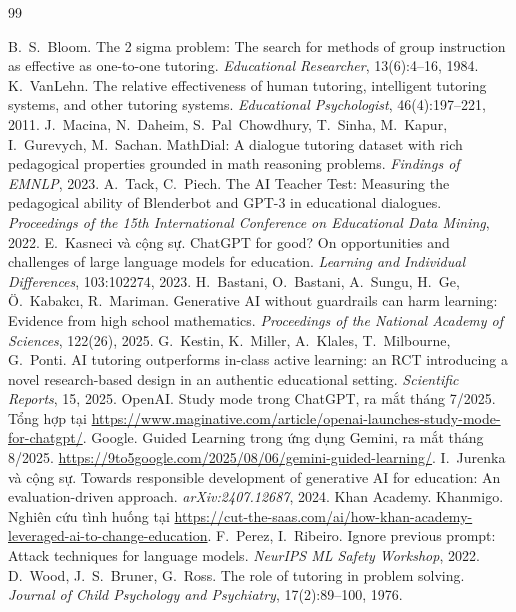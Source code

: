 \begin{thebibliography}{99}\small
\setlength{\itemsep}{2pt}

 B.~S.~Bloom. The 2 sigma problem: The search for methods of group instruction as effective as one-to-one tutoring. \emph{Educational Researcher}, 13(6):4--16, 1984.
 K.~VanLehn. The relative effectiveness of human tutoring, intelligent tutoring systems, and other tutoring systems. \emph{Educational Psychologist}, 46(4):197--221, 2011.
 J.~Macina, N.~Daheim, S.~Pal~Chowdhury, T.~Sinha, M.~Kapur, I.~Gurevych, M.~Sachan. MathDial: A dialogue tutoring dataset with rich pedagogical properties grounded in math reasoning problems. \emph{Findings of EMNLP}, 2023.
 A.~Tack, C.~Piech. The AI Teacher Test: Measuring the pedagogical ability of Blenderbot and GPT-3 in educational dialogues. \emph{Proceedings of the 15th International Conference on Educational Data Mining}, 2022.
 E.~Kasneci và cộng sự. ChatGPT for good? On opportunities and challenges of large language models for education. \emph{Learning and Individual Differences}, 103:102274, 2023.
 H.~Bastani, O.~Bastani, A.~Sungu, H.~Ge, Ö.~Kabakcı, R.~Mariman. Generative AI without guardrails can harm learning: Evidence from high school mathematics. \emph{Proceedings of the National Academy of Sciences}, 122(26), 2025.
 G.~Kestin, K.~Miller, A.~Klales, T.~Milbourne, G.~Ponti. AI tutoring outperforms in-class active learning: an RCT introducing a novel research-based design in an authentic educational setting. \emph{Scientific Reports}, 15, 2025.
 OpenAI. Study mode trong ChatGPT, ra mắt tháng 7/2025. Tổng hợp tại \url{https://www.maginative.com/article/openai-launches-study-mode-for-chatgpt/}.
 Google. Guided Learning trong ứng dụng Gemini, ra mắt tháng 8/2025. \url{https://9to5google.com/2025/08/06/gemini-guided-learning/}.
 I.~Jurenka và cộng sự. Towards responsible development of generative AI for education: An evaluation-driven approach. \emph{arXiv:2407.12687}, 2024.
 Khan Academy. Khanmigo. Nghiên cứu tình huống tại \url{https://cut-the-saas.com/ai/how-khan-academy-leveraged-ai-to-change-education}.
 F.~Perez, I.~Ribeiro. Ignore previous prompt: Attack techniques for language models. \emph{NeurIPS ML Safety Workshop}, 2022.
 D.~Wood, J.~S.~Bruner, G.~Ross. The role of tutoring in problem solving. \emph{Journal of Child Psychology and Psychiatry}, 17(2):89--100, 1976.

\end{thebibliography}
